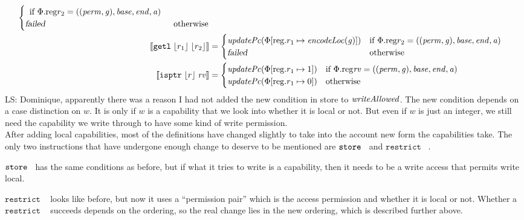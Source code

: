 \documentclass[a4paper]{article}
\newcommand{\update}[2]{[#1 \mapsto #2]}
\newcommand{\sem}[1]{\left\llbracket #1 \right\rrbracket}
\newcommand\lau[1]{{\color{purple} \sf \footnotesize {LS: #1}}\\}
\newcommand{\var}[1]{\mathit{#1}}
\newcommand{\rv}{\var{rv}}
\newcommand{\gl}{\var{g}}
\newcommand{\addr}{\var{a}}
\newcommand{\start}{\var{base}}
\newcommand{\addrend}{\var{end}}
\newcommand{\perm}{\var{perm}}
\newcommand{\stdcap}[1][(\perm,\gl)]{\left(#1,\start,\addrend,\addr \right)}
\newcommand{\plainproj}[1]{\mathrm{#1}}
\newcommand{\memreg}[1][\Phi]{#1.\plainproj{reg}}
\newcommand{\updateReg}[3][\Phi]{#1\update{\plainproj{reg}.#2}{#3}}
\newcommand{\failed}{\textsl{failed}}
\newcommand{\plainfun}[2]{
  \ifthenelse{\equal{#2}{}}
             {\mathit{#1}}
             {\mathit{#1}(#2)}
}
\newcommand{\encodeLoc}{\mathit{encodeLoc}{}}
\newcommand{\writeAllowed}[1]{\plainfun{writeAllowed}{#1}}
\newcommand{\stdUpdatePc}[1]{\plainfun{updatePc}{#1}}
\newcommand{\refreg}[1]{\lfloor #1 \rfloor}
\newcommand{\zinstr}[1]{\mathtt{#1}}
\newcommand{\twoinstr}[3]{\zinstr{#1} \; #2 \; #3}
\newcommand{\isptr}[2]{\twoinstr{isptr}{#1}{#2}}
\newcommand{\getl}[2]{\twoinstr{getl}{#1}{#2}}
\newcommand{\store}[2]{\twoinstr{store}{#1}{#2}}
\newcommand{\threeinstr}[4]{\zinstr{#1} \; #2 \; #3 \; #4}
\newcommand{\restrict}[3]{\threeinstr{restrict}{#1}{#2}{#3}}
\begin{document}
\begin{align*}
\begin{cases}
\begin{array}[t]{l}
                              \text{if $\memreg{r_2} = \stdcap$}
                            \end{array} \\
                            \failed & \text{otherwise}
                          \end{cases}
  \\
  \sem{\getl{\refreg{r_1}}{\refreg{r_2}}} & = 
                          \begin{cases}
                            \stdUpdatePc{\updateReg{r_1}{\encodeLoc(\gl)}} &
                            \arraycolsep=0pt
                            \begin{array}[t]{l}
                              \text{if $\memreg{r_2} = \stdcap$}
                            \end{array} \\
                            \failed & \text{otherwise}
                          \end{cases}
  \\
  \sem{\isptr{\refreg{r}}{\rv}} & =  
                          \begin{cases}
                            \stdUpdatePc{\updateReg{r_1}{1}} & \text{if $\memreg{\rv} = \stdcap$} \\
                            \stdUpdatePc{\updateReg{r_1}{0}} & \text{otherwise} 
                          \end{cases}
\end{align*}
\lau{Dominique, apparently there was a reason I had not added the new condition in store to $\writeAllowed{}$. The new condition depends on a case distinction on $w$. It is only if $w$ is a capability that we look into whether it is local or not. But even if $w$ is just an integer, we still need the capability we write through to have some kind of write permission.}

After adding local capabilities, most of the definitions have changed slightly to take into the account new form the capabilities take. The only two instructions that have undergone enough change to deserve to be mentioned are $\store{}$ and $\restrict{}{}{}$. 

$\store{}$ has the same conditions as before, but if what it tries to write is a capability, then it needs to be a write access that permits write local.

$\restrict{}{}{}$ looks like before, but now it uses a ``permission pair'' which is the access permission and whether it is local or not. Whether a $\restrict{}{}{}$ succeeds depends on the ordering, so the real change lies in the new ordering, which is described further above.
\end{document}
